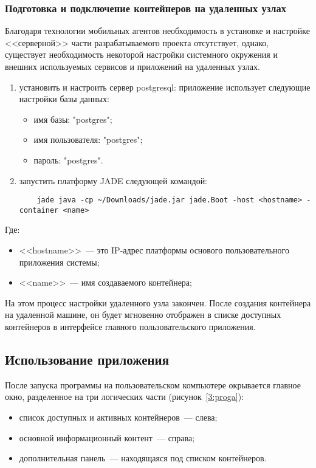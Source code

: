 \subsubsection{Подготовка и подключение контейнеров на удаленных узлах}
Благодаря технологии мобильных агентов необходимость в установке и настройке <<серверной>> части разрабатываемого проекта отсутствует, однако, существует необходимость некоторой настройки системного окружения и внешних используемых сервисов и приложений на удаленных узлах.
\begin{enumerate}
\item установить и настроить сервер postgresql: приложение использует следующие настройки базы данных:
    \begin{itemize}
        \item имя базы: "postgres";
        \item имя пользователя: "postgres";
        \item пароль: "postgres".
    \end{itemize}
\item запустить платформу JADE следующей командой:
    \begin{verbatim}
    jade java -cp ~/Downloads/jade.jar jade.Boot -host <hostname> -container <name>
    \end{verbatim}
\end{enumerate}
Где:
\begin{itemize}
    \item <<hostname>>~--- это IP-адрес платформы основого пользовательного приложения системы;
    \item <<name>>~--- имя создаваемого контейнера;
\end{itemize}
На этом процесс настройки удаленного узла закончен. После создания контейнера на удаленной машине, он будет мгновенно отображен в списке доступных контейнеров в интерфейсе главного пользовательского приложения.

\subsection{Использование приложения}
После запуска программы на пользовательском компьютере окрывается главное окно, разделенное на три логических части (рисунок~\ref{3:proga}):
\begin{itemize}
\item список доступных и активных контейнеров~--- слева;
\item основной информационный контент~--- справа;
\item дополнительная панель~--- находящаяся под списком контейнеров.
\end{itemize}

